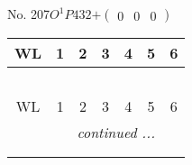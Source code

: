 \documentclass[fleqn,9pt,landscape]{jsarticle}
\begin{document}
\newpage
No. 207\quad$O_{}^{1}$\quad$P432$\quad[ cubic ]\quad$+\begin{pmatrix} 0 & 0 & 0 \end{pmatrix}$
\begin{center}
\renewcommand{\arraystretch}{1.2}
\begin{longtable}{ccccccc}
 \hline \hline
WL & 1 & 2 & 3 & 4 & 5 & 6 \\ \hline \endfirsthead

\multicolumn{6}{l}{\tablename\ \thetable{}} \\
 \hline \hline
WL & 1 & 2 & 3 & 4 & 5 & 6 \\ \hline \endhead

 \hline \hline
\multicolumn{6}{r}{\footnotesize\it continued ...} \\ \endfoot

 \hline \hline
\multicolumn{6}{r}{} \\ \endlastfoot


\end{longtable}
\end{center}
\end{document}
